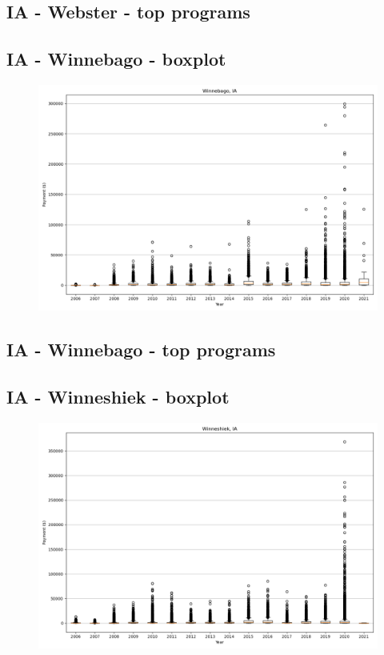 \subsection*{IA - Webster - top programs}

\newpage
\subsection*{IA - Winnebago - boxplot}
\begin{figure}[h]
\centering
\includegraphics[width=7in]{../output/boxplots/counties/Winnebago-IA_boxplot.png}
\end{figure}


\subsection*{IA - Winnebago - top programs}

\newpage
\subsection*{IA - Winneshiek - boxplot}
\begin{figure}[h]
\centering
\includegraphics[width=7in]{../output/boxplots/counties/Winneshiek-IA_boxplot.png}
\end{figure}


